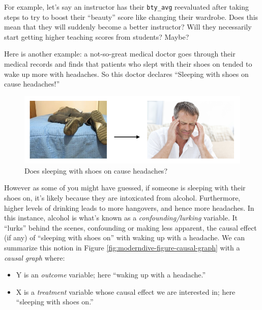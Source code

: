 \documentclass[12pt, krantz2,]{krantz}
\providecommand{\tightlist}{%
  \setlength{\itemsep}{0pt}\setlength{\parskip}{0pt}}
\begin{document}
For example, let's say an instructor has their \texttt{bty\_avg} reevaluated after taking steps to try to boost their ``beauty'' score like changing their wardrobe. Does this mean that they will suddenly become a better instructor? Will they necessarily start getting higher teaching scores from students? Maybe?

Here is another example: a not-so-great medical doctor goes through their medical records and finds that patients who slept with their shoes on tended to wake up more with headaches. So this doctor declares ``Sleeping with shoes on cause headaches!''

\begin{figure}

{\centering \includegraphics[width=\textwidth]{images/flowcharts/flowchart.010-cropped} 

}

\caption{Does sleeping with shoes on cause headaches?}\label{fig:moderndive-figure-causal-graph-2}
\end{figure}

However as some of you might have guessed, if someone is sleeping with their shoes on, it's likely because they are intoxicated from alcohol. Furthermore, higher levels of drinking leads to more hangovers, and hence more headaches. In this instance, alcohol is what's known as a \emph{confounding/lurking} variable. It ``lurks'' behind the scenes, confounding or making less apparent, the causal effect (if any) of ``sleeping with shoes on'' with waking up with a headache. We can summarize this notion in Figure \ref{fig:moderndive-figure-causal-graph} with a \emph{causal graph} where:

\begin{itemize}
\tightlist
\item
  Y is an \emph{outcome} variable; here ``waking up with a headache.''
\item
  X is a \emph{treatment} variable whose causal effect we are interested in; here ``sleeping with shoes on.''
\end{itemize}
\end{document}

